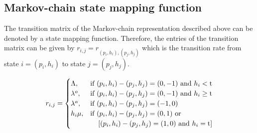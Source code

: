 \documentclass{article}
\begin{document}
\subsection{Markov-chain state mapping function}
The transition matrix of the Markov-chain representation described above can be denoted by a state mapping function. Therefore, the entries of the transition matrix can be given by $r_{i,j} = r_{(p_i, h_i),(p_j, h_j)}$ which is the transition rate from state $i = (p_i, h_i)$ to state $j = (p_j , h_j)$.

\begin{equation}
    r_{i, j} = 
    \begin{cases}
        \Lambda, & \text{if } (p_i,h_i) - (p_j, h_j) = (0,-1) \text{ and } h_i < \text{t} \\
        \lambda^o, & \text{if } (p_i,h_i) - (p_j, h_j) = (0,-1) \text{ and } h_i \geq \text{t} \\
        \lambda^a, & \text{if } (p_i,h_i) - (p_j, h_j) = (-1,0) \\
        h_i \mu, & \text{if } (p_i,h_i) - (p_j, h_j) = (0,1) \text{ or } \\
         & \hspace{0.4cm} [(p_i,h_i) - (p_j, h_j) = (1,0) \text{ and } h_i = \text{t}]
    \end{cases}
\end{equation}
\restoregeometry
\end{document}

